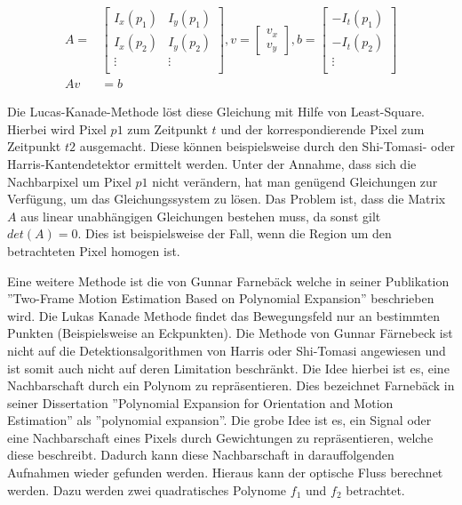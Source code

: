 \begin{subequations}\label{eq:opFlow8} 
\begin{align}
A = &
\begin{bmatrix}
I_x(p_1) & I_y(p_1) \\
I_x(p_2) & I_y(p_2) \\
\vdots & \vdots \\
\end{bmatrix}
,v=
\begin{bmatrix}
v_x\\
v_y
\end{bmatrix}
,b= \begin{bmatrix}
-I_t(p_1) \\
-I_t(p_2)  \\
\vdots \\
\end{bmatrix}\\
A v & = b
\end{align}
\end{subequations}

Die Lucas-Kanade-Methode löst diese Gleichung mit Hilfe von Least-Square. Hierbei wird Pixel $p1$ zum Zeitpunkt $t$ und der korrespondierende Pixel zum Zeitpunkt $t2$ ausgemacht. Diese können beispielsweise durch den Shi-Tomasi- oder Harris-Kantendetektor ermittelt werden. Unter der Annahme, dass sich die Nachbarpixel um Pixel $p1$ nicht verändern, hat man genügend Gleichungen zur Verfügung, um das Gleichungssystem zu lösen. Das Problem ist, dass die Matrix $A$ aus linear unabhängigen Gleichungen bestehen muss, da sonst gilt $det(A) = 0$.
Dies ist beispielsweise der Fall, wenn die Region um den betrachteten Pixel homogen ist.

Eine weitere Methode ist die von Gunnar Farnebäck welche in seiner Publikation ''Two-Frame Motion Estimation Based on Polynomial Expansion'' \cite{10.1007/3-540-45103-X_50} beschrieben wird. Die Lukas Kanade Methode findet das Bewegungsfeld nur an bestimmten Punkten (Beispielsweise an Eckpunkten). Die Methode von Gunnar Färnebeck ist nicht auf die Detektionsalgorithmen von Harris oder Shi-Tomasi angewiesen und ist somit auch nicht auf deren Limitation beschränkt. Die Idee hierbei ist es, eine Nachbarschaft durch ein Polynom zu repräsentieren. Dies bezeichnet Farnebäck in seiner Dissertation ''Polynomial Expansion for Orientation and Motion Estimation'' \cite{farnebäck2002polynomial} als ''polynomial expansion''. Die grobe Idee ist es, ein Signal oder eine Nachbarschaft eines Pixels durch Gewichtungen zu repräsentieren, welche diese beschreibt. Dadurch kann diese Nachbarschaft in darauffolgenden Aufnahmen wieder gefunden werden. Hieraus kann der optische Fluss berechnet werden.
Dazu werden zwei quadratisches Polynome $f_1$ und $f_2$ betrachtet.

